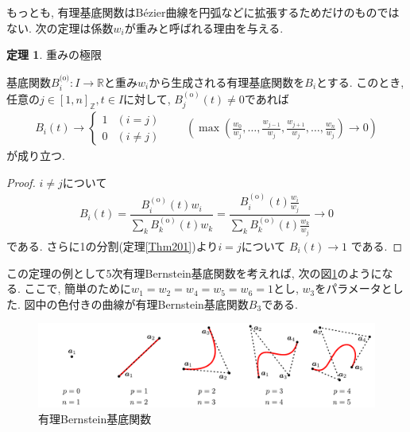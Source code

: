\documentclass{jsarticle}
\newcommand\setR{\mathbb{R}}
\newcommand\Pare[1]{\left(#1\right)}
\newcommand\squa[1]{[#1]}
\newcommand\Z[2]{\squa{#1,#2}_\mathbb{Z}}
\theoremstyle{definition}%
\newtheorem{thm}{定理}
\begin{document}
もっとも, 有理基底関数はB\'ezier曲線を円弧などに拡張するためだけのものではない.
次の定理は係数$w_i$が重みと呼ばれる理由を与える.
\begin{screen}
	\begin{thm}
		重みの極限

		基底関数$B_i^{\text{(o)}}:I\to\setR$と重み$w_i$から生成される有理基底関数を$B_i$とする.
        このとき, 任意の$j\in\Z{1}{n}, t\in I$に対して, $B_{j}^{(\text{o})}(t)\neq 0$であれば
		\begin{align}
			B_i(t)\to
			\begin{cases}
				1 &(i=j) \\
				0 &(i\neq j)
			\end{cases} \qquad
            \Pare{\max\Pare{\frac{w_0}{w_{j}},\dots,\frac{w_{{j}-1}}{w_{j}},\frac{w_{{j}+1}}{w_{j}},\dots,\frac{w_n}{w_{j}}}
			\to
			0}
		\end{align}
		が成り立つ.
	\end{thm}
\end{screen}
\begin{proof}
	$i\neq j$について
	\begin{align}
		B_i(t)
		=
		\dfrac{B_{i}^{(\text{o})}(t)w_i}{\sum\limits_{k}B_{k}^{(\text{o})}(t)w_k}
		=
		\dfrac{B_{i}^{(\text{o})}(t)\frac{w_i}{w_{j}}}{\sum\limits_{k}B_{k}^{(\text{o})}(t)\frac{w_k}{w_{j}}}
		\to
		0
	\end{align}
	である.
	さらに1の分割(定理\ref{Thm201})より$i=j$について
	$B_i(t)\to 1$
    である.
\end{proof}
\newpage
この定理の例として$5$次有理Bernstein基底関数を考えれば, 次の図\ref{Fig212}のようになる.
ここで, 簡単のために$w_1=w_2=w_4=w_5=w_6=1$とし, $w_3$をパラメータとした.
図中の色付きの曲線が有理Bernstein基底関数$B_3$である.
\addtocounter{footnote}{-1}
\begin{figure}[H]
	\centering
    \includegraphics[page=6,clip,width=160mm]{fig.pdf}
	\caption{有理Bernstein基底関数\protect \footnotemark}
	\label{Fig212}
\end{figure}
\end{document}

